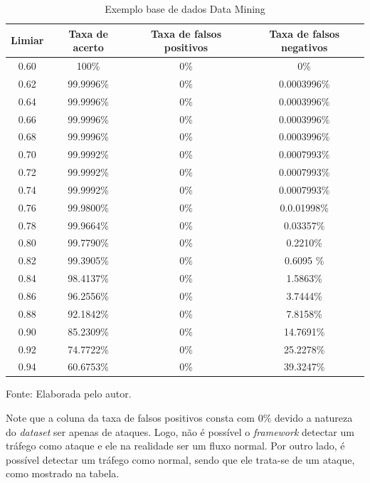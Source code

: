 \begin{table}[htb]
 	\centering
 	\begin{threeparttable}
 		\caption{Exemplo base de dados Data Mining}
 		\label{Tab:ResultsMining}
 		\begin{tabular}{c c c c}
 			\toprule
 			\textbf{Limiar} & \textbf{Taxa de acerto} & \textbf{Taxa de falsos positivos} & \textbf{Taxa de falsos negativos}
 			\\ \midrule
	 			
 			0.60 &  100\% &  0\%& 0\%   \\ \midrule
 			0.62 &  99.9996\% &  0\%& 0.0003996\%   \\ \midrule
 			0.64 &  99.9996\% &  0\%& 0.0003996\%   \\ \midrule
 			0.66 &  99.9996\% &  0\%& 0.0003996\%   \\ \midrule
 			0.68 &  99.9996\% &  0\%& 0.0003996\%   \\ \midrule
 			0.70 &  99.9992\% &  0\%& 0.0007993\%   \\ \midrule
 			0.72 &  99.9992\% &  0\%& 0.0007993\%   \\ \midrule
 			0.74 &  99.9992\% &  0\%& 0.0007993\%   \\ \midrule
 			0.76 &  99.9800\% &  0\%& 0.0.01998\%   \\ \midrule
 			0.78 &  99.9664\% &  0\%& 0.03357\%   \\\midrule 		 			 			 			 			 			 			 			
 			0.80 &  99.7790\% &  0\%& 0.2210\%   \\ \midrule
 			0.82 &  99.3905\% & 0\% & 0.6095 \%   \\ \midrule
 			0.84 &  98.4137\%  & 0\% & 1.5863\%   \\ \midrule
 			0.86 &  96.2556\%  &  0\% & 3.7444\%   \\ \midrule
 			0.88 &  92.1842\%  &  0\% & 7.8158\%     \\ \midrule
 			0.90 &  85.2309\%  & 0\% & 14.7691\%    \\ \midrule
 			0.92 &  74.7722\%  &  0\% & 25.2278\%   \\ \midrule
 			0.94 &  60.6753\%  & 0\% & 39.3247\%   \\ \bottomrule
 		\end{tabular}
 		{Fonte: Elaborada pelo autor.}
 	\end{threeparttable}
 \end{table}
 Note que a coluna da taxa de falsos positivos consta com $0\%$ devido a natureza do \textit{dataset} ser apenas de ataques. Logo, não é possível o \textit{framework} detectar um tráfego como ataque e ele na realidade ser um fluxo normal. Por outro lado, é possível detectar um tráfego como normal, sendo que ele trata-se de um ataque, como mostrado na tabela.
